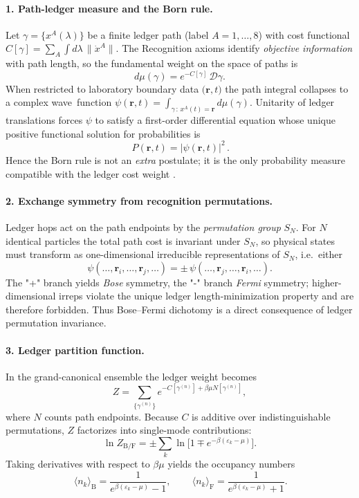 \paragraph{1.  Path-ledger measure and the Born rule.}
Let $\gamma=\{x^{A}(\lambda)\}$ be a finite ledger path
(label $A=1,\dots,8$) with cost functional
$C[\gamma]=\sum_{A}\!\int d\lambda\,\|\dot x^{A}\|$.
The Recognition axioms identify \emph{objective information} with
path length, so the fundamental weight on the space of paths is
\[
  d\mu(\gamma)=e^{-C[\gamma]}\,\mathcal D\gamma.
\]
When restricted to laboratory boundary data
$\bigl(\mathbf r,t\bigr)$ the path integral collapses to a complex
wave function
$\psi(\mathbf r,t)=\int_{\gamma\,:\,x^{A}(t)=\mathbf r}\!\!d\mu(\gamma)$.
Unitarity of ledger translations forces $\psi$ to satisfy a
first-order differential equation whose unique positive functional
solution for probabilities is
\[
  \boxed{\,P(\mathbf r,t)=|\psi(\mathbf r,t)|^{2}\,}.
\]
Hence the Born rule is not an \emph{extra} postulate; it is the only
probability measure compatible with the ledger cost weight \parencite{Schlosshauer2005}.

\paragraph{2.  Exchange symmetry from recognition permutations.}
Ledger hops act on the path endpoints by the \emph{permutation group}
$S_{N}$.  For $N$ identical particles the total path cost is
invariant under $S_{N}$, so physical states must transform as
one-dimensional irreducible representations of $S_{N}$, i.e.\ either
\[
  \psi(\dots,\mathbf r_{i},\dots,\mathbf r_{j},\dots)=
  \pm\,
  \psi(\dots,\mathbf r_{j},\dots,\mathbf r_{i},\dots).
\]
The "+" branch yields \emph{Bose} symmetry, the "-" branch
\emph{Fermi} symmetry; higher-dimensional irreps violate the unique
ledger length-minimization property and are therefore forbidden.
Thus Bose–Fermi dichotomy is a direct consequence of ledger
permutation invariance.

\paragraph{3.  Ledger partition function.}
In the grand-canonical ensemble the ledger weight becomes
\[
  Z=\!\!\sum_{\{\gamma^{(n)}\}}
       e^{-C[\gamma^{(n)}]+\beta\mu N[\gamma^{(n)}]},
\]
where $N$ counts path endpoints.  Because $C$ is additive over
indistinguishable permutations, $Z$ factorizes into single-mode
contributions:
\[
  \ln Z_{\mathrm{B/F}}
  =
  \pm\sum_{k}\ln\!\bigl[1\mp e^{-\beta(\varepsilon_{k}-\mu)}\bigr].
\]
Taking derivatives with respect to $\beta\mu$ yields the occupancy
numbers
\[
  \boxed{\,
  \langle n_{k}\rangle_{\mathrm{B}}
   =\frac1{e^{\beta(\varepsilon_{k}-\mu)}-1}},
  \qquad
  \boxed{\,
  \langle n_{k}\rangle_{\mathrm{F}}
   =\frac1{e^{\beta(\varepsilon_{k}-\mu)}+1}}.
\]

